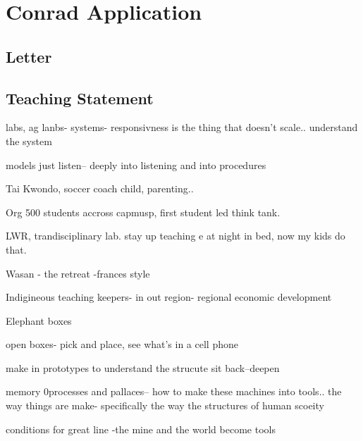 \chapter{Conrad Application}

\begin{comment}

TODO 
 January 12, 2023. 
 - Email your curriculum vitae, 
 - cover letter (including details of relevant work experience outside the academy, if applicable), 
 - teaching statement, and 
 - research statement

- LinkedIn
- ReseachGate/ORCID
-

- copy xx's lab

JOB DESCRIPTION
https://uwaterloo.ca/engineering/associate-or-full-professor-organizational-behaviour?utm_source=dept&utm_medium=dept&utm_id=dept

\end{comment}

\section{Letter}
\section{Teaching Statement}

labs, ag lanbs- systems- 
responsivness is the thing that doesn't scale.. understand the system

models
just listen-- deeply into listening and into procedures

Tai Kwondo, soccer coach child, parenting.. 

Org 500 students accross capmusp, first student led think tank.

LWR, trandisciplinary lab.
stay up teaching e at night in bed, now my kids do that.

Wasan - the retreat -frances style

Indigineous teaching keepers- in out region- regional economic development

Elephant boxes


open boxes- pick and place, see what's in a cell phone

make in prototypes to understand the strucute
sit back--deepen

memory 0processes and pallaces-- how to make these machines into tools.. the way things are make- specifically the way the structures of human scoeity


conditions for great line -the mine and the world become tools

